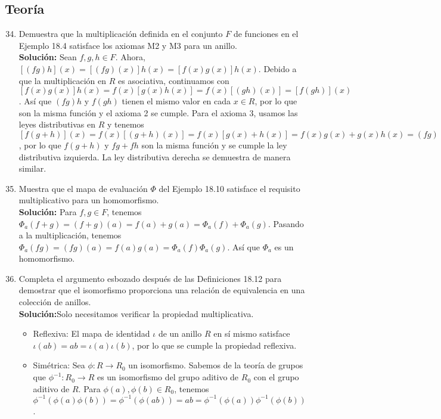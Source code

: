 \subsection*{Teoría}
\begin{enumerate}
	\setcounter{enumi}{33}
	\item Demuestra que la multiplicación definida en el conjunto $F$ de funciones en el Ejemplo 18.4 satisface los axiomas M2 y M3 para un anillo. 
	\\ \textbf{Solución:}
	Sean $f, g, h \in F$. Ahora, $[(fg)h](x) = [(fg)(x)]h(x) = [f(x)g(x)]h(x)$. Debido a que la multiplicación en $R$ es asociativa, continuamos con $[f(x)g(x)]h(x) = f(x)[g(x)h(x)] = f(x)[(gh)(x)] = [f(gh)](x)$. Así que $(fg)h$ y $f(gh)$ tienen el mismo valor en cada $x \in R$, por lo que son la misma función y el axioma 2 se cumple. Para el axioma 3, usamos las leyes distributivas en $R$ y tenemos $[f(g + h)](x) = f(x)[(g + h)(x)] = f(x)[g(x) + h(x)] = f(x)g(x) + g(x)h(x) = (fg)(x) + (fh)(x) = (fg + fh)(x)$, por lo que $f(g + h)$ y $fg + fh$ son la misma función y se cumple la ley distributiva izquierda. La ley distributiva derecha se demuestra de manera similar.
	\item Muestra que el mapa de evaluación $\Phi$ del Ejemplo 18.10 satisface el requisito multiplicativo para un homomorfismo.
	\\ \textbf{Solución:}
	Para $f, g \in F$, tenemos $\Phi_a(f + g) = (f + g)(a) = f(a) + g(a) = \Phi_a(f) + \Phi_a(g)$. Pasando a la multiplicación, tenemos $\Phi_a(fg) = (fg)(a) = f(a)g(a) = \Phi_a(f)\Phi_a(g)$. Así que $\Phi_a$ es un homomorfismo.
	\item Completa el argumento esbozado después de las Definiciones 18.12 para demostrar que el isomorfismo proporciona una relación de equivalencia en una colección de anillos.
	\\ \textbf{Solución:}Solo necesitamos verificar la propiedad multiplicativa.
	\begin{itemize}
		\item Reflexiva: El mapa de identidad $\iota$ de un anillo $R$ en sí mismo satisface $\iota(ab) = ab = \iota(a)\iota(b)$, por lo que se cumple la propiedad reflexiva.
		\item Simétrica: Sea $\phi: R \to R_0$ un isomorfismo. Sabemos de la teoría de grupos que $\phi^{-1}: R_0 \to R$ es un isomorfismo del grupo aditivo de $R_0$ con el grupo aditivo de $R$. Para $\phi(a), \phi(b) \in R_0$, tenemos $\phi^{-1}(\phi(a)\phi(b)) = \phi^{-1}(\phi(ab)) = ab = \phi^{-1}(\phi(a))\phi^{-1}(\phi(b))$.

\end{itemize}
\end{enumerate}
